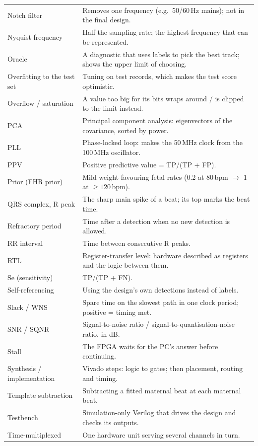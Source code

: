 \documentclass[11pt]{article}
\begin{document}
{\begin{longtable}{@{}p{3.4cm} p{12.0cm}@{}}
Notch filter & Removes one frequency (e.g.\ 50/60\,Hz mains); not in the final design. \\
Nyquist frequency & Half the sampling rate; the highest frequency that can be represented. \\
Oracle & A diagnostic that uses labels to pick the best track; shows the upper limit of choosing. \\
Overfitting to the test set & Tuning on test records, which makes the test score optimistic. \\
Overflow / saturation & A value too big for its bits wraps around / is clipped to the limit instead. \\
PCA & Principal component analysis: eigenvectors of the covariance, sorted by power. \\
PLL & Phase-locked loop: makes the 50\,MHz clock from the 100\,MHz oscillator. \\
PPV & Positive predictive value = TP/(TP + FP). \\
Prior (FHR prior) & Mild weight favouring fetal rates (0.2 at 80\,bpm $\to$ 1 at $\ge 120$\,bpm). \\
QRS complex, R peak & The sharp main spike of a beat; its top marks the beat time. \\
Refractory period & Time after a detection when no new detection is allowed. \\
RR interval & Time between consecutive R peaks. \\
RTL & Register-transfer level: hardware described as registers and the logic between them. \\
Se (sensitivity) & TP/(TP + FN). \\
Self-referencing & Using the design's own detections instead of labels. \\
Slack / WNS & Spare time on the slowest path in one clock period; positive = timing met. \\
SNR / SQNR & Signal-to-noise ratio / signal-to-quantisation-noise ratio, in dB. \\
Stall & The FPGA waits for the PC's answer before continuing. \\
Synthesis / implementation & Vivado steps: logic to gates; then placement, routing and timing. \\
Template subtraction & Subtracting a fitted maternal beat at each maternal beat. \\
Testbench & Simulation-only Verilog that drives the design and checks its outputs. \\
Time-multiplexed & One hardware unit serving several channels in turn. \\

\end{longtable}}
\end{document}
